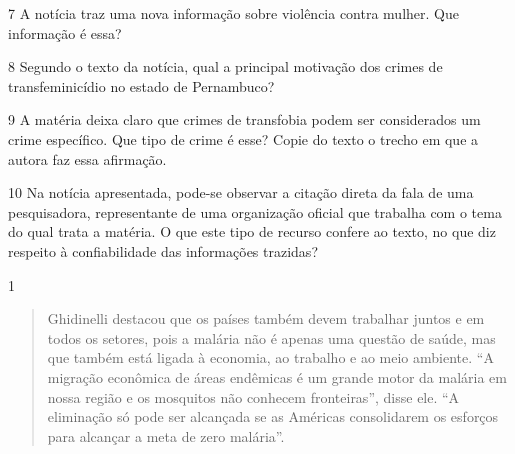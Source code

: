 
\num{7} A notícia traz uma nova informação sobre violência contra mulher. Que informação é essa?


\num{8} Segundo o texto da notícia, qual a principal motivação dos crimes de transfeminicídio no estado de Pernambuco?


\num{9} A matéria deixa claro que crimes de transfobia podem ser considerados um crime específico.
Que tipo de crime é esse? Copie do texto o trecho em que a autora faz essa afirmação.


\num{10} Na notícia apresentada, pode-se observar a citação direta da fala de
uma pesquisadora, representante de uma organização oficial que trabalha
com o tema do qual trata a matéria. O que este tipo de recurso confere
ao texto, no que diz respeito à confiabilidade das informações trazidas?



\num{1}

\begin{quote}
Ghidinelli destacou que os países também devem trabalhar juntos e em
todos os setores, pois a malária não é apenas uma questão de saúde, mas
que também está ligada à economia, ao trabalho e ao meio ambiente. ``A
migração econômica de áreas endêmicas é um grande motor da malária em
nossa região e os mosquitos não conhecem fronteiras'', disse ele. ``A
eliminação só pode ser alcançada se as Américas consolidarem os esforços
para alcançar a meta de zero malária''.
\end{quote}


